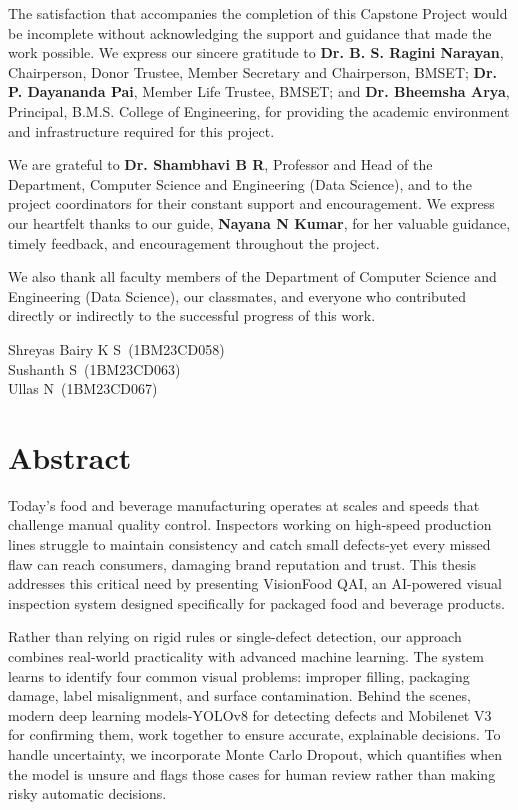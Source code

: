 \documentclass[12pt,a4paper]{report}
\newcommand{\shorttitle}{VisionFood QAI}
\newcommand{\studentone}{Shreyas Bairy K S}
\newcommand{\usnone}{1BM23CD058}
\newcommand{\studenttwo}{Sushanth S}
\newcommand{\usntwo}{1BM23CD063}
\newcommand{\studentthree}{Ullas N}
\newcommand{\usnthree}{1BM23CD067}
\newcommand{\guidename}{Nayana N Kumar}
\begin{document}
\noindent The satisfaction that accompanies the completion of this Capstone Project would be incomplete without acknowledging the support and guidance that made the work possible. We express our sincere gratitude to \textbf{Dr. B. S. Ragini Narayan}, Chairperson, Donor Trustee, Member Secretary and Chairperson, BMSET; \textbf{Dr. P. Dayananda Pai}, Member Life Trustee, BMSET; and \textbf{Dr. Bheemsha Arya}, Principal, B.M.S. College of Engineering, for providing the academic environment and infrastructure required for this project.

\noindent We are grateful to \textbf{Dr. Shambhavi B R}, Professor and Head of the Department, Computer Science and Engineering (Data Science), and to the project coordinators for their constant support and encouragement. We express our heartfelt thanks to our guide, \textbf{\guidename}, for her valuable guidance, timely feedback, and encouragement throughout the project.

\noindent We also thank all faculty members of the Department of Computer Science and Engineering (Data Science), our classmates, and everyone who contributed directly or indirectly to the successful progress of this work.

\vspace{1.5cm}
\begin{flushright}
\studentone\ (\usnone)\\
\studenttwo\ (\usntwo)\\
\studentthree\ (\usnthree)
\end{flushright}

\newpage
\chapter*{\centering Abstract}

Today's food and beverage manufacturing operates at scales and speeds that challenge manual quality control. Inspectors working on high-speed production lines struggle to maintain consistency and catch small defects-yet every missed flaw can reach consumers, damaging brand reputation and trust. This thesis addresses this critical need by presenting \shorttitle, an AI-powered visual inspection system designed specifically for packaged food and beverage products.

Rather than relying on rigid rules or single-defect detection, our approach combines real-world practicality with advanced machine learning. The system learns to identify four common visual problems: improper filling, packaging damage, label misalignment, and surface contamination. Behind the scenes, modern deep learning models-YOLOv8 for detecting defects and Mobilenet V3 for confirming them, work together to ensure accurate, explainable decisions. To handle uncertainty, we incorporate Monte Carlo Dropout, which quantifies when the model is unsure and flags those cases for human review rather than making risky automatic decisions.
\end{document}
